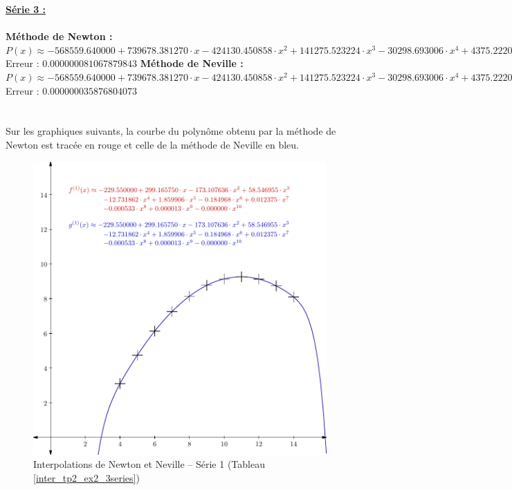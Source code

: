 \documentclass{report}
\begin{document}
	\noindent\underline{\textbf{Série 3 :}} \\ \\
	\textbf{Méthode de Newton :}\\
	$P(x) \approx -568559.640000 + 739678.381270 \cdot x- 424130.450858 \cdot x^{2}  + 141275.523224 \cdot x^{3} - 30298.693006 \cdot x^{4}  + 4375.222059 \cdot x^{5} - 431.155992 \cdot x^{6}  + 28.652640 \cdot x^{7} - 1.229803 \cdot x^{8}  + 0.030806 \cdot x^{9} - 0.000342 \cdot x^{10} $\\
	Erreur : $0.000000081067879843$
	\newline
	\newline
	\textbf{Méthode de Neville :}\\
	$P(x) \approx -568559.640000 + 739678.381270 \cdot x- 424130.450858 \cdot x^{2}  + 141275.523224 \cdot x^{3} - 30298.693006 \cdot x^{4}  + 4375.222059 \cdot x^{5} - 431.155992 \cdot x^{6}  + 28.652640 \cdot x^{7} - 1.229803 \cdot x^{8}  + 0.030806 \cdot x^{9} - 0.000342 \cdot x^{10} $\\
	Erreur : $0.000000035876804073$\\
	\\ \\
	Sur les graphiques suivants, la courbe du polynôme obtenu par la méthode de Newton est tracée en rouge et celle de la méthode de Neville en bleu.
	\newpage
	\begin{figure}[h]
	  \centering
  	\includegraphics[scale=0.5]{graphiques/pdf_output/inter_tp2_ex2_1.pdf}
	  \caption{Interpolations de Newton et Neville -- Série 1 (Tableau \ref{inter_tp2_ex2_3series})}
	\end{figure}
\end{document}
